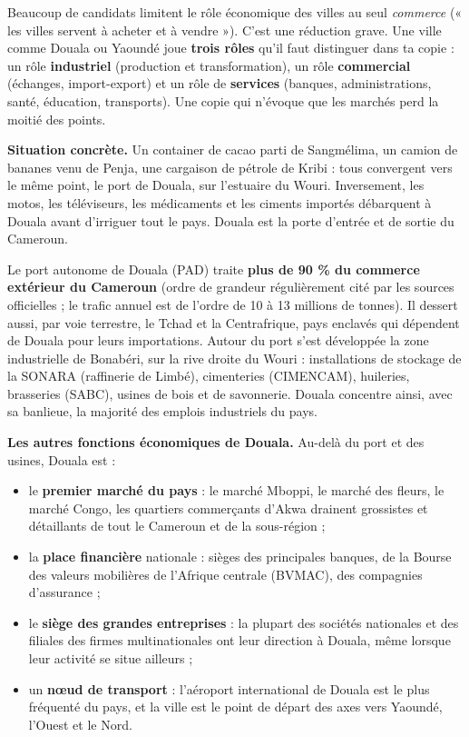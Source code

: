 \documentclass[11pt]{article}
\newcommand{\cle}[1]{{\popxbold\color{popdark}#1}}
\newcounter{popsec}
\newcounter{popsub}
\newcommand{\courssub}[1]{%
  \stepcounter{popsub}%
  \par\vspace{9pt}\noindent{\popxbold\fontsize{11.5}{13}\selectfont\color{popink}{\color{poporange}\thepopsec.\thepopsub}\hspace{6pt}#1}\par\nopagebreak\vspace{4pt}
}
\begin{document}
\begin{attention}
Beaucoup de candidats limitent le rôle économique des villes au seul \emph{commerce} (« les villes servent à acheter et à vendre »). C'est une réduction grave. Une ville comme Douala ou Yaoundé joue \textbf{trois rôles} qu'il faut distinguer dans ta copie : un rôle \textbf{industriel} (production et transformation), un rôle \textbf{commercial} (échanges, import-export) et un rôle de \textbf{services} (banques, administrations, santé, éducation, transports). Une copie qui n'évoque que les marchés perd la moitié des points.
\end{attention}

\courssub{Douala, capitale économique du Cameroun}

\textbf{Situation concrète.} Un container de cacao parti de Sangmélima, un camion de bananes venu de Penja, une cargaison de pétrole de Kribi : tous convergent vers le même point, le port de Douala, sur l'estuaire du Wouri. Inversement, les motos, les téléviseurs, les médicaments et les ciments importés débarquent à Douala avant d'irriguer tout le pays. Douala est la porte d'entrée et de sortie du Cameroun.

\begin{exemplebox}
Le \cle{port autonome de Douala} (PAD) traite \textbf{plus de 90 \% du commerce extérieur du Cameroun} (ordre de grandeur régulièrement cité par les sources officielles ; le trafic annuel est de l'ordre de 10 à 13 millions de tonnes). Il dessert aussi, par voie terrestre, le Tchad et la Centrafrique, pays enclavés qui dépendent de Douala pour leurs importations. Autour du port s'est développée la \cle{zone industrielle de Bonabéri}, sur la rive droite du Wouri : installations de stockage de la SONARA (raffinerie de Limbé), cimenteries (CIMENCAM), huileries, brasseries (SABC), usines de bois et de savonnerie. Douala concentre ainsi, avec sa banlieue, la majorité des emplois industriels du pays.
\end{exemplebox}

\textbf{Les autres fonctions économiques de Douala.} Au-delà du port et des usines, Douala est :
\begin{itemize}
\item le \textbf{premier marché du pays} : le marché Mboppi, le marché des fleurs, le marché Congo, les quartiers commerçants d'Akwa drainent grossistes et détaillants de tout le Cameroun et de la sous-région ;
\item la \textbf{place financière} nationale : sièges des principales banques, de la Bourse des valeurs mobilières de l'Afrique centrale (BVMAC), des compagnies d'assurance ;
\item le \textbf{siège des grandes entreprises} : la plupart des sociétés nationales et des filiales des firmes multinationales ont leur direction à Douala, même lorsque leur activité se situe ailleurs ;
\item un \textbf{nœud de transport} : l'aéroport international de Douala est le plus fréquenté du pays, et la ville est le point de départ des axes vers Yaoundé, l'Ouest et le Nord.
\end{itemize}
\end{document}
